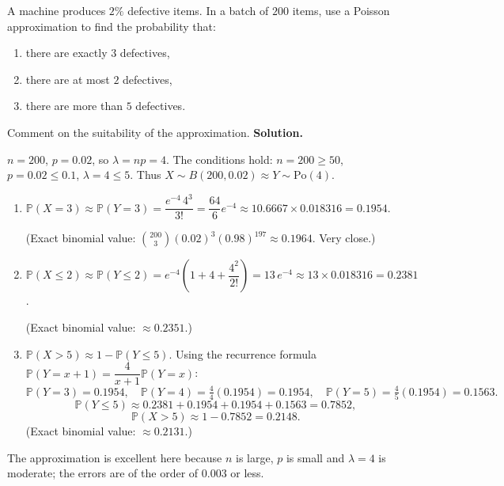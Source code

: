 \documentclass[11pt]{article}
\begin{document}
\begin{exoresolu}
A machine produces $2\%$ defective items. In a batch of $200$ items, use a Poisson approximation to find the probability that:
\begin{enumerate}
\item there are exactly $3$ defectives,
\item there are at most $2$ defectives,
\item there are more than $5$ defectives.
\end{enumerate}
Comment on the suitability of the approximation.
\tcblower
\textbf{Solution.}

$n = 200$, $p = 0.02$, so $\lambda = np = 4$. The conditions hold: $n = 200 \ge 50$, $p = 0.02 \le 0.1$, $\lambda = 4 \le 5$. Thus $X \sim B(200, 0.02) \approx Y \sim \mathrm{Po}(4)$.
\begin{enumerate}
\item $\mathbb{P}(X = 3) \approx \mathbb{P}(Y = 3) = \dfrac{e^{-4}\,4^3}{3!} = \dfrac{64}{6}e^{-4} \approx 10.6667 \times 0.018316 = 0.1954$.

(Exact binomial value: $\binom{200}{3}(0.02)^3(0.98)^{197} \approx 0.1964$. Very close.)
\item $\mathbb{P}(X \le 2) \approx \mathbb{P}(Y \le 2) = e^{-4}\left(1 + 4 + \dfrac{4^2}{2!}\right) = 13\,e^{-4} \approx 13 \times 0.018316 = 0.2381$.

(Exact binomial value: $\approx 0.2351$.)
\item $\mathbb{P}(X > 5) \approx 1 - \mathbb{P}(Y \le 5)$. Using the recurrence formula $\mathbb{P}(Y=x+1) = \dfrac{4}{x+1}\mathbb{P}(Y=x)$:
\[
\mathbb{P}(Y=3) = 0.1954, \quad \mathbb{P}(Y=4) = \tfrac{4}{4}(0.1954) = 0.1954, \quad \mathbb{P}(Y=5) = \tfrac{4}{5}(0.1954) = 0.1563.
\]
\[
\mathbb{P}(Y \le 5) \approx 0.2381 + 0.1954 + 0.1954 + 0.1563 = 0.7852,
\]
\[
\mathbb{P}(X > 5) \approx 1 - 0.7852 = 0.2148.
\]
(Exact binomial value: $\approx 0.2131$.)
\end{enumerate}
The approximation is excellent here because $n$ is large, $p$ is small and $\lambda = 4$ is moderate; the errors are of the order of $0.003$ or less.
\end{exoresolu}
\end{document}
